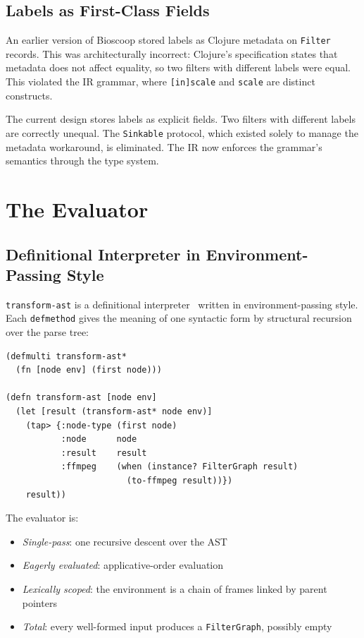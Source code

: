 \documentclass[conference]{IEEEtran}
\begin{document}
\subsection{Labels as First-Class Fields}

An earlier version of Bioscoop stored labels as Clojure metadata on \texttt{Filter} records. This was architecturally incorrect: Clojure's specification states that metadata does not affect equality, so two filters with different labels were equal. This violated the IR grammar, where \texttt{[in]scale} and \texttt{scale} are distinct constructs.

The current design stores labels as explicit fields. Two filters with different labels are correctly unequal. The \texttt{Sinkable} protocol, which existed solely to manage the metadata workaround, is eliminated. The IR now enforces the grammar's semantics through the type system.

\section{The Evaluator}

\subsection{Definitional Interpreter in Environment-Passing Style}

\texttt{transform-ast} is a definitional interpreter~\cite{reynolds} written in environment-passing style. Each \texttt{defmethod} gives the meaning of one syntactic form by structural recursion over the parse tree:

\begin{lstlisting}[caption={The evaluator entry point}]
(defmulti transform-ast*
  (fn [node env] (first node)))

(defn transform-ast [node env]
  (let [result (transform-ast* node env)]
    (tap> {:node-type (first node)
           :node      node
           :result    result
           :ffmpeg    (when (instance? FilterGraph result)
                        (to-ffmpeg result))})
    result))
\end{lstlisting}

The evaluator is:

\begin{itemize}
\item \emph{Single-pass}: one recursive descent over the AST
\item \emph{Eagerly evaluated}: applicative-order evaluation
\item \emph{Lexically scoped}: the environment is a chain of frames linked by parent pointers
\item \emph{Total}: every well-formed input produces a \texttt{FilterGraph}, possibly empty
\end{itemize}
\end{document}
